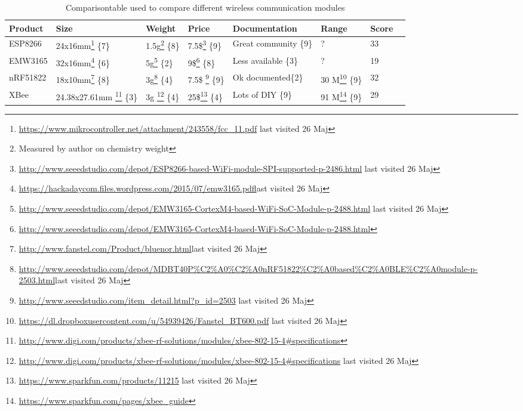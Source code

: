 \begin{savenotes}
\begin{table}[H]
	\centering
	\begin{tabular}{@{}|l|l|l|l|l|l|l|l|@{}}
		\toprule
		\textbf{Product} & \textbf{Size} & \textbf{Weight} & \textbf{Price} & \textbf{Documentation} &  \textbf{Range}  & \textbf{Score} \\ \midrule
		ESP8266   &  24x16mm\footnote{\url{https://www.mikrocontroller.net/attachment/243558/fcc\_11.pdf} last visited 26 Maj} \hfill\{7\} & 1.5g\footnote{Measured by author on chemistry weight} \hfill\{8\} &   7.5\$\footnote{\url{http://www.seeedstudio.com/depot/ESP8266-based-WiFi-module-SPI-supported-p-2486.html} last visited 26 Maj}  \hfill\{9\}  &   Great community \hfill\{9\}  &    ?    &          33      		\\ \midrule
		EMW3165   &  32x16mm\footnote{\url{https://hackadaycom.files.wordpress.com/2015/07/emw3165.pdf}last visited 26 Maj} \hfill\{6\}  & 5g\footnote{\url{http://www.seeedstudio.com/depot/EMW3165-CortexM4-based-WiFi-SoC-Module-p-2488.html} last visited 26 Maj} \hfill\{2\} &  9\$\footnote{\url{http://www.seeedstudio.com/depot/EMW3165-CortexM4-based-WiFi-SoC-Module-p-2488.html}} \hfill\{8\}   &  Less available  \hfill\{3\}	        &    ?    &    19            		\\ \midrule
		nRF51822  &  18x10mm\footnote{\url{http://www.fanstel.com/Product/bluenor.html}last visited 26 Maj} \hfill\{8\}  & 3g\footnote{\url{http://www.seeedstudio.com/depot/MDBT40P\%C2\%A0\%C2\%A0nRF51822\%C2\%A0based\%C2\%A0BLE\%C2\%A0module-p-2503.html}last visited 26 Maj} \hfill\{4\}  &  7.5\$ \footnote{\url{http://www.seeedstudio.com/item_detail.html?p_id=2503} last visited 26 Maj} \hfill\{9\}   & Ok documented\hfill\{2\} 	        &   30 M\footnote{\url{https://dl.dropboxusercontent.com/u/54939426/Fanstel_BT600.pdf} last visited 26 Maj}  \hfill\{9\}     &               32 		\\ \midrule
		XBee      &  24.38x27.61mm \footnote{\url{http://www.digi.com/products/xbee-rf-solutions/modules/xbee-802-15-4\#specifications}} \{3\} & 3g \footnote{\url{http://www.digi.com/products/xbee-rf-solutions/modules/xbee-802-15-4\#specifications} last visited 26 Maj} \hfill\{4\} &   25\$\footnote{\url{https://www.sparkfun.com/products/11215} last visited 26 Maj}  \hfill\{4\}  &  Lots of DIY   \hfill\{9\}      &            91 M\footnote{\url{https://www.sparkfun.com/pages/xbee_guide}}  \hfill\{9\}  &             29       \\ \bottomrule
	\end{tabular}
	\caption{Comparisontable used to compare different wireless 		communication modules}
	\label{tab:compare_table_wireless_communication}
\end{table}
    \end{savenotes}

